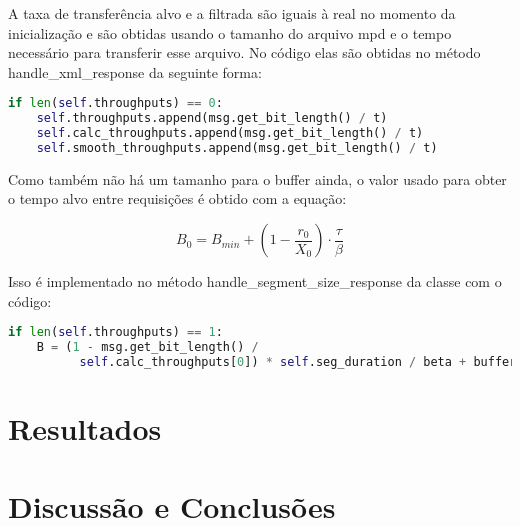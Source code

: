 \documentclass[10pt,twocolumn,letterpaper]{article}
\begin{document}
A taxa de transferência alvo e a filtrada são iguais à real no momento da inicialização e são obtidas usando o tamanho do arquivo mpd e o tempo necessário para transferir esse arquivo. No código elas são obtidas no método handle\_xml\_response da seguinte forma:

\begin{lstlisting}[language=python]
  if len(self.throughputs) == 0:
    self.throughputs.append(msg.get_bit_length() / t)
    self.calc_throughputs.append(msg.get_bit_length() / t)
    self.smooth_throughputs.append(msg.get_bit_length() / t)
\end{lstlisting}

Como também não há um tamanho para o buffer ainda, o valor usado para obter o tempo alvo entre requisições é obtido com a equação:

\begin{equation}
  B_0 = B_{min} + (1 - \frac{r_0}{X_0}) \cdot \frac{\tau}{\beta}
\end{equation}

Isso é implementado no método handle\_segment\_size\_response da classe com o código:

\begin{lstlisting}[language=python]
  if len(self.throughputs) == 1:
    B = (1 - msg.get_bit_length() /
          self.calc_throughputs[0]) * self.seg_duration / beta + buffer_min
\end{lstlisting}
\section{Resultados}


\section{Discussão e Conclusões}

{\small


}
\end{document}
